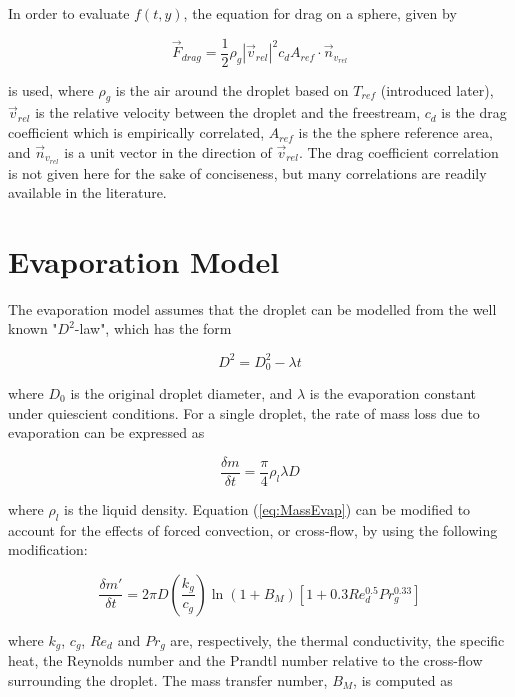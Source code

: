 \documentclass[12pt]{article}
\begin{document}
In order to evaluate $f(t, y)$, the equation for drag on a sphere, given by

\begin{equation}
\vec{F}_{drag} = \frac{1}{2}\rho_{g} |\vec{v}_{rel}|^{2}c_{d}A_{ref} \cdot \vec{n}_{v_{rel}}
\end{equation}

is used, where $\rho_{g}$ is the air around the droplet based on $T_{ref}$ (introduced later), $\vec{v}_{rel}$ is the relative velocity between the droplet and the freestream, $c_{d}$ is the drag coefficient which is empirically correlated, $A_{ref}$ is the the sphere reference area, and $\vec{n}_{v_{rel}}$ is a unit vector in the direction of $\vec{v}_{rel}$. The drag coefficient correlation is not given here for the sake of conciseness, but many correlations are readily available in the literature.

\section{Evaporation Model}\label{sec:EvapModel}

The evaporation model assumes that the droplet can be modelled from the well known "$D^{2}$-law", which has the form

\begin{equation}\label{eq:DSquaredLaw}
D^{2} = D_{0}^{2} - \lambda t
\end{equation}

where $D_{0}$ is the original droplet diameter, and $\lambda$ is the evaporation constant under quiescient conditions. For a single droplet, the rate of mass loss due to evaporation can be expressed as

\begin{equation}\label{eq:MassEvap}
\frac{\delta m}{\delta t} = \frac{\pi}{4} \rho_{l} \lambda D
\end{equation}

where $\rho_{l}$ is the liquid density. Equation (\ref{eq:MassEvap}) can be modified to account for the effects of forced convection, or cross-flow, by using the following modification:

\begin{equation}
\frac{\delta m'}{\delta t} = 2 \pi D \left(\frac{k_{g}}{c_{g}}\right)\ln(1 + B_{M})\left[1 + 0.3Re_{d}^{0.5}Pr_{g}^{0.33}\right]
\end{equation}

where $k_{g}$, $c_{g}$, $Re_{d}$ and $Pr_{g}$ are, respectively, the thermal conductivity, the specific heat, the Reynolds number and the Prandtl number relative to the cross-flow surrounding the droplet. The mass transfer number, $B_{M}$, is computed as
\end{document}
